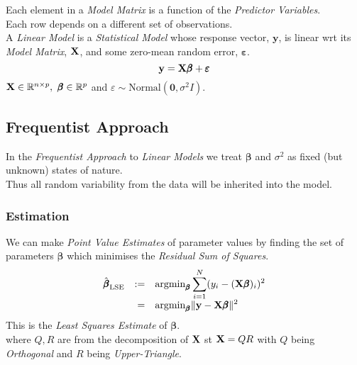 \documentclass[11pt,a4paper]{article}
\begin{document}

Each element in a \textit{Model Matrix} is a function of the \textit{Predictor Variables}.\\
Each row depends on a different set of observations.\\

A \textit{Linear Model} is a \textit{Statistical Model} whose response vector, $\textbf{y}$, is linear wrt its \textit{Model Matrix}, $\textbf{X}$, and some zero-mean random error, $\pmb\varepsilon$.
$$\textbf{y}=\textbf{X}\pmb\beta+\pmb\varepsilon$$
$\X\in\reals^{n\times p},\ \pmb\beta\in\reals^p$ and $\varepsilon\sim\text{Normal}(\pmb0,\sigma^2 I)$.

\subsection{Frequentist Approach}

In the \textit{Frequentist Approach} to \textit{Linear Models} we treat $\pmb\beta$ and $\sigma^2$ as fixed (but unknown) states of nature.\\
Thus all random variability from the data will be inherited into the model.\\

\subsubsection{Estimation}

We can make \textit{Point Value Estimates} of parameter values by finding the set of parameters $\pmb\beta$ which minimises the \textit{Residual Sum of Squares}.
\[\begin{array}{rrl}
\hat{\pmb\beta}_\text{LSE}&:=&\displaystyle{\text{argmin}_{\pmb\beta}\sum_{i=1}^N(y_i-(\textbf{X}\pmb\beta)_i)^2}\\
&=&\displaystyle{\text{argmin}_{\pmb\beta}\|\textbf{y}-\textbf{X}\pmb\beta\|^2}
\end{array}\]
\nb This is the \textit{Least Squares Estimate} of $\pmb\beta$.\\

where $Q,R$ are from the decomposition of $\textbf{X}$ st $\textbf{X}=QR$ with $Q$ being \textit{Orthogonal} and $R$ being \textit{Upper-Triangle}.\\
\end{document}
